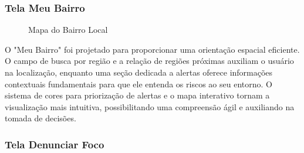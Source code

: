 \documentclass[a4paper, 12pt]{article}
\begin{document}
\subsubsection{Tela Meu Bairro}

\begin{figure}[H]
  \centering
  \caption{Mapa do Bairro Local}
  \label{fig:bairro}
\end{figure}

O "Meu Bairro" foi projetado para proporcionar uma orientação espacial eficiente.  O campo de busca por região e a relação de regiões próximas auxiliam o usuário na localização, enquanto uma seção dedicada a alertas oferece informações contextuais fundamentais para que ele entenda os riscos ao seu entorno.  O sistema de cores para priorização de alertas e o mapa interativo tornam a visualização mais intuitiva, possibilitando uma compreensão ágil e auxiliando na tomada de decisões.

\subsubsection{Tela Denunciar Foco}
\end{document}

